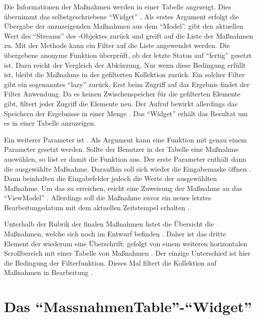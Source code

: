 Die Informationen der Maßnahmen werden in einer Tabelle angezeigt.
Dies übernimmt das selbstgeschriebene \enquote{Widget}  .
Als erstes Argument erfolgt die Übergabe der anzuzeigenden Maßnahmen aus dem \enquote{Model}.
 gibt den aktuellen Wert des \enquote{Streams} des -Objektes zurück und greift auf die Liste der Maßnahmen zu.
Mit der Methode   kann ein Filter auf die Liste angewendet werden.
Die übergebene anonyme Funktion  überprüft, ob der letzte Status auf \enquote{fertig} gesetzt ist.
Dazu reicht der Vergleich der Abkürzung.
Nur wenn diese Bedingung erfüllt ist,
bleibt die Maßnahme in der gefilterten Kollektion zurück.
Ein solcher Filter gibt ein sogenanntes \enquote{lazy}  zurück.
Erst beim Zugriff auf das Ergebnis findet der Filter Anwendung.
Da es keinen Zwischenspeicher für die gefilterten Elemente gibt,
filtert jeder Zugriff die Elemente neu.
Der Aufruf  bewirkt allerdings das Speichern der Ergebnisse in einer Menge .
Das \enquote{Widget}  erhält das Resultat um es in einer Tabelle anzuzeigen.

Ein weiterer Parameter ist  .
Als Argument kann eine Funktion mit genau einem Parameter gesetzt werden.
Sollte der Benutzer in der Tabelle eine Maßnahme auswählen, so löst er damit die Funktion aus.
Der erste Parameter enthält dann die ausgewählte Maßnahme.
Daraufhin soll sich wieder die Eingabemaske öffnen .
Dann beinhalten die Eingabefelder jedoch die Werte der ausgewählten Maßnahme.
Um das zu erreichen, reicht eine Zuweisung der Maßnahme an das \enquote{ViewModel} .
Allerdings soll die Maßnahme zuvor ein neues letztes Bearbeitungsdatum mit dem aktuellen Zeitstempel erhalten .

Unterhalb der Rubrik der finalen Maßnahmen listet die Übersicht die Maßnahmen, welche sich noch im Entwurf befinden .
Daher ist das dritte Element der  wiederum eine Überschrift:   gefolgt von einem weiteren horizontalen Scrollbereich  mit einer Tabelle von Maßnahmen .
Der einzige Unterschied ist hier die Bedingung der Filterfunktion.
Dieses Mal filtert die Kollektion auf Maßnahmen in Bearbeitung .


\section{Das \enquote{MassnahmenTable}-\enquote{Widget}}

